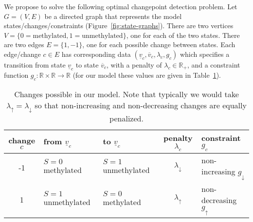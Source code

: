 \documentclass[12pt]{article}
\newcommand{\RR}{\mathbb R}
\begin{document}
We propose to
solve the following optimal changepoint detection problem. Let
$G=(V,E)$ be a directed graph that represents the model
states/changes/constraints (Figure~\ref{fig:state-graphs}). There are two
vertices $V=\{0=\text{methylated},1=\text{unmethylated}\}$, one for
each of the two states. There are two edges
$E=\{1,-1\}$, one for each possible change between
states. Each edge/change $c\in E$ has corresponding data
$(\underline v_c, \overline v_c, \lambda_c, g_c)$ which specifies a
transition from state $\underline v_c$ to state $\overline v_c$, with
a penalty of $\lambda_c\in\RR_+$, and a constraint function
$g_c:\RR\times\RR\rightarrow\RR$ (for our model these values are given
in Table~\ref{tab:changes}).
\begin{table}
  \centering
\begin{tabular}{cllcl}
change $c$ &  from $\underline v_c$ & to $\underline v_c$ & penalty $\lambda_c$ & constraint $g_c$ \\
\hline
-1 & $S=0$ methylated & $S=1$ unmethylated & $\lambda_\downarrow$ & non-increasing $g_\downarrow$\\
1 &$S=1$ unmethylated & $S=0$ methylated & $\lambda_\uparrow$ & non-decreasing $g_\uparrow$
\end{tabular}
\caption{Changes possible in our model. Note that typically we would take $\lambda_\uparrow=\lambda_\downarrow$ 
  so that non-increasing and non-decreasing changes are equally penalized.}
  \label{tab:changes}
\end{table}
\begin{figure*}
\centering
\caption{State/change graph for our model. Nodes represent
  states $S_i$ and edges represent changes $c_i$. Each change has a corresponding
  penalty $\lambda$, and a function $g$ that determines what types of
  changes are possible ($g_\uparrow$ non-decreasing,
  $g_\downarrow$ non-increasing). Even though there are no edges from a node
  to itself, it is still possible to stay in the same state without
  introducing a changepoint and penalty. }
  \label{fig:state-graphs}
\end{figure*}
\end{document}
